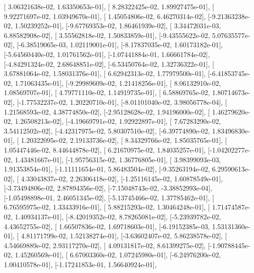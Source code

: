 \documentclass{article}
\begin{document}
       [ 3.06321638e-02,  1.63350653e-01],
       [ 8.28322425e-02,  1.89927475e-01],
       [ 9.92271697e-02,  1.03949670e-01],
       [ 1.45054806e-02,  6.46270314e-02],
       [-9.21363238e-02,  1.50239252e-01],
       [-9.67769353e-02,  1.86461939e-02],
       [ 3.34472031e-03,  6.88582908e-02],
       [ 3.55562818e-02,  1.50833859e-01],
       [-9.43555622e-02,  5.07635577e-02],
       [-6.38519065e-03,  1.02119001e-01],
       [-8.17837035e-02,  1.60173182e-01],
       [-5.64560440e-02,  1.01761562e-01],
       [-1.07441884e-01,  1.66661784e-02],
       [-4.84291324e-02,  2.68648851e-02],
       [-6.53450764e-02,  1.32736322e-01],
       [ 3.67881064e-02,  1.58031376e-01],
       [ 6.62942313e-02,  1.77979500e-01],
       [-6.41853745e-02,  1.71063435e-01],
       [-9.29989609e-02,  1.21418256e-01],
       [ 8.06132910e-02,  1.08569707e-01],
       [ 4.79771110e-02,  1.14919735e-01],
       [ 6.58869765e-02,  1.80714673e-02],
       [-1.77532237e-02,  1.20220710e-01],
       [-8.01101040e-02,  3.98056778e-04],
       [ 1.21568593e-02,  4.38774850e-02],
       [-2.95128628e-02,  1.94196000e-02],
       [ 1.46279620e-02,  1.26508213e-02],
       [-4.19669791e-02,  1.92922897e-01],
       [ 7.67283290e-02,  3.54112502e-02],
       [-4.42317975e-02,  5.80307510e-02],
       [-6.39774890e-02,  1.83496830e-01],
       [ 1.20322095e-02,  2.19133736e-02],
       [ 8.34329766e-02,  1.85035765e-01],
       [ 1.05447446e-02,  8.44644878e-02],
       [ 6.21670975e-02,  1.84035257e-01],
       [-1.04202277e-02,  1.43481667e-01],
       [-1.95756315e-02,  1.36776805e-01],
       [ 3.98399093e-03,  1.91353854e-01],
       [-1.11111654e-01,  5.86483504e-02],
       [-9.35263194e-02,  6.29590613e-02],
       [ 4.33043837e-02,  2.26306418e-02],
       [-1.25116145e-02,  1.60878549e-01],
       [-3.73494806e-02,  2.87894356e-02],
       [-7.15048743e-02, -3.38852993e-04],
       [-1.05498898e-01,  2.46051345e-02],
       [-5.13745466e-02,  1.37785462e-01],
       [ 6.76595975e-02,  1.33433916e-01],
       [ 5.88215293e-02,  1.30464248e-01],
       [ 1.71474587e-02,  1.40934137e-01],
       [-8.42019352e-02,  8.78265081e-02],
       [-5.23939782e-02,  4.43652755e-02],
       [ 1.66507836e-02,  1.69718603e-01],
       [-6.19152385e-03,  1.53131360e-01],
       [ 4.81171799e-02,  1.52138274e-01],
       [-3.63602407e-02,  5.86238578e-02],
       [ 4.54669889e-02,  2.93117270e-02],
       [ 4.09131817e-02,  8.61399275e-02],
       [-1.90788445e-02,  1.45260569e-01],
       [ 6.67003360e-02,  1.07245980e-01],
       [-6.24976200e-02,  1.00410578e-01],
       [-1.17241853e-01,  1.56640924e-01],
\end{document}
